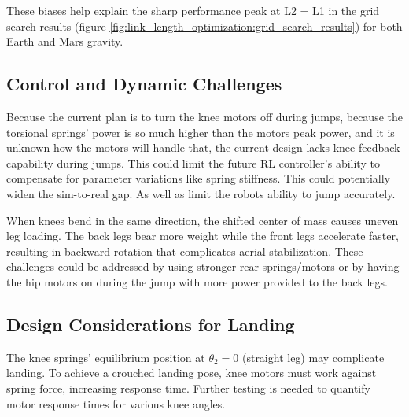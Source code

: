 These biases help explain the sharp performance peak at L2 = L1 in the grid search results (figure \ref{fig:link_length_optimization:grid_search_results}) for both Earth and Mars gravity.

\subsection{Control and Dynamic Challenges}
Because the current plan is to turn the knee motors off during jumps, because the torsional springs' power is so much higher than the motors peak power, and it is unknown how the motors will handle that, the current design lacks knee feedback capability during jumps. This could limit the future RL controller's ability to compensate for parameter variations like spring stiffness. This could potentially widen the sim-to-real gap. As well as limit the robots ability to jump accurately. 

When knees bend in the same direction, the shifted center of mass causes uneven leg loading. The back legs bear more weight while the front legs accelerate faster, resulting in backward rotation that complicates aerial stabilization. These challenges could be addressed by using stronger rear springs/motors or by having the hip motors on during the jump with more power provided to the back legs.

\subsection{Design Considerations for Landing}
The knee springs' equilibrium position at $\theta_2=0$ (straight leg) may complicate landing. To achieve a crouched landing pose, knee motors must work against spring force, increasing response time. Further testing is needed to quantify motor response times for various knee angles.

